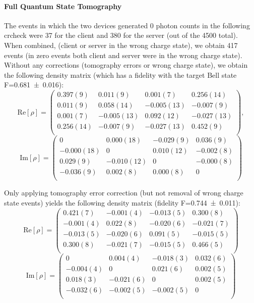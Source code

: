 \paragraph{Full Quantum State Tomography}

The events in which the two devices generated \num{0} photon counts in the following
\acrshort{crcheck} were \num{37} for the client and \num{380} for the server (out of the \num{4500}
total). When combined, (client or server in the wrong charge state), we obtain \num{417} events (in
zero events both client and server were in the wrong charge state). Without any corrections
(tomography errors or wrong charge state), we obtain the following density matrix (which has a
fidelity with the target Bell state F=\num{0.681(16)}):
\[
    \mathrm{Re}[\rho] = \begin{pmatrix}
        0.397(9)  & 0.011(9)   & 0.001(7)   & 0.256(14)  \\
        0.011(9)  & 0.058(14)  & -0.005(13) & -0.007(9)  \\
        0.001(7)  & -0.005(13) & 0.092(12)  & -0.027(13) \\
        0.256(14) & -0.007(9)  & -0.027(13) & 0.452(9)   \\
    \end{pmatrix},
\]
\[
    \mathrm{Im}[\rho] = \begin{pmatrix}
        0          & 0.000(18)  & -0.029(9) & 0.036(9)  \\
        -0.000(18) & 0          & 0.010(12) & -0.002(8) \\
        0.029(9)   & -0.010(12) & 0         & -0.000(8) \\
        -0.036(9)  & 0.002(8)   & 0.000(8)  & 0         \\
    \end{pmatrix}
\]

Only applying tomography error correction (but not removal of wrong charge state events) yields the
following density matrix (fidelity F=\num{0.744(11)}):
\[
    \mathrm{Re}[\rho] = \begin{pmatrix}
        0.421(7)  & -0.001(4) & -0.013(5) & 0.300(8)  \\
        -0.001(4) & 0.022(8)  & -0.020(6) & -0.021(7) \\
        -0.013(5) & -0.020(6) & 0.091(5)  & -0.015(5) \\
        0.300(8)  & -0.021(7) & -0.015(5) & 0.466(5)  \\
    \end{pmatrix}
\]
\[
    \mathrm{Im}[\rho] = \begin{pmatrix}
        0         & 0.004(4)  & -0.018(3) & 0.032(6) \\
        -0.004(4) & 0         & 0.021(6)  & 0.002(5) \\
        0.018(3)  & -0.021(6) & 0         & 0.002(5) \\
        -0.032(6) & -0.002(5) & -0.002(5) & 0        \\
    \end{pmatrix}
\]


